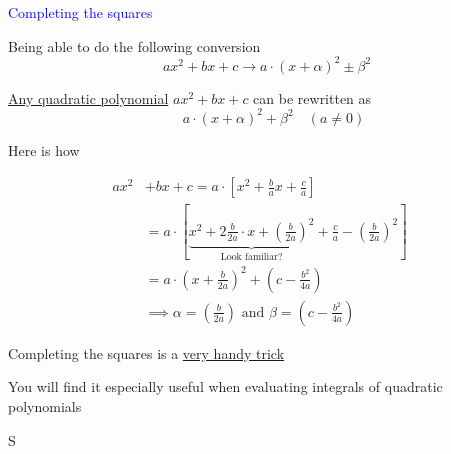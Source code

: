 \documentclass[14pt,fleqn]{extarticle}
\begin{document}
 

\begin{skill}
    \begin{narrow}
    \textcolor{blue}{Completing the squares}

Being able to do the following conversion
\small\[ \quad ax^2 + bx + c \longrightarrow a\cdot \left(x + \alpha \right)^2 \pm \beta^2 \]\normalsize          
    \end{narrow}
    
    \reason 
    
    \underline{Any quadratic polynomial} $ax^2 + bx + c$ can be rewritten as 
\[ \qquad a\cdot \left(x + \alpha \right)^2 + \beta^2\quad \left(a \neq 0 \right)\] 

Here is how 

\begin{align}
	ax^2 &+ bx + c = a\cdot \left[x^2 + \frac{b}{a} x + \frac{c}{a} \right] \\
	&= a\cdot \left[\underbrace{x^2 + 2\frac{b}{2a}\cdot x + \left(\frac{b}{2a} \right)^2}_{\text{Look familiar?}} +  \frac{c}{a} - \left(\frac{b}{2a} \right)^2  \right] \\
	&= a\cdot \left(x + \frac{b}{2a} \right)^2 + \left(c-\frac{b^2}{4a} \right) \\
	&\implies \alpha = \left(\frac{b}{2a} \right)\text{ and } \beta = \left(c-\frac{b^2}{4a} \right)
\end{align}


Completing the squares is a \underline{very handy trick}\newline 

You will find it especially useful when evaluating integrals of quadratic polynomials 
\end{skill}
S
\end{document}
